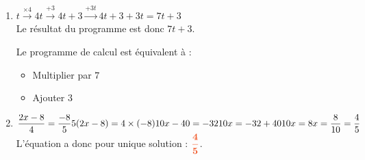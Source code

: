 \documentclass[a4paper,11pt]{article}
\begin{document}
{\begin{seanceD}{}
\begin{enumerate}
\medskip
Il faut donc appliquer une hausse d'environ $35{,}14\,\%$ pour revenir au niveau de départ.

\item  $t\xrightarrow{\times  4} 4t\xrightarrow{+3}4t+3 \xrightarrow{+3t}4t+3+3t=7t+3$\\Le résultat du programme est donc $7t+3$.

\medskip
Le programme de calcul est équivalent à :	\begin{itemize}
		\item Multiplier par $7$
		\item Ajouter $3$
	\end{itemize}


\item $\dfrac{2x-8}{4}=\dfrac{-8}{5}\\
5( 2x-8 )=4 \times (-8)\\
10x-40=-32\\
10x=-32+40\\
10x=8\\
x=\dfrac{8}{10}=\dfrac{4}{5}$
\\L'équation a donc pour unique solution : ${\color[HTML]{f15929}\boldsymbol{\dfrac{4}{5}}}$.

\end{enumerate}
\end{seanceD}}
\end{document}
